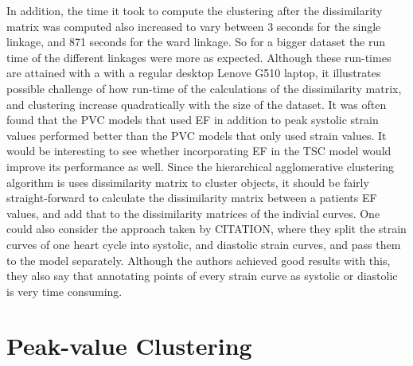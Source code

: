 In addition, the time it took to compute the clustering after the dissimilarity matrix was computed also increased to vary between 3 seconds for the single linkage, and 871 seconds for the ward linkage.
So for a bigger dataset the run time of the different linkages were more as expected. 
Although these run-times are attained with a with a regular desktop Lenove G510 laptop, it illustrates possible challenge of how run-time of the calculations of the dissimilarity matrix, and clustering increase quadratically with the size of the dataset.
It was often found that the PVC models that used EF in addition to peak systolic strain values performed better than the PVC models that only used strain values.
It would be interesting to see whether incorporating EF in the TSC model would improve its performance as well.
Since the hierarchical agglomerative clustering algorithm is uses dissimilarity matrix to cluster objects, it should be fairly straight-forward to calculate the dissimilarity matrix between a patients EF values, and add that to the dissimilarity matrices of the indivial curves.
One could also consider the approach taken by CITATION, where they split the strain curves of one heart cycle into systolic, and diastolic strain curves, and pass them to the model separately. 
Although the authors achieved good results with this, they also say that annotating points of every strain curve as systolic or diastolic is very time consuming.

\section{Peak-value Clustering}

